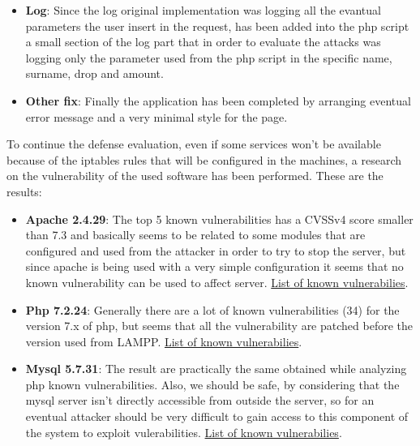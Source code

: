 \documentclass[14pt]{article}
\begin{document}
\begin{itemize}
	\item \textbf{Log}: Since the log original implementation was logging all the evantual parameters the user insert in the request, has been added into the php script a small section of the log part that in order to evaluate the attacks was logging only the parameter used from the php script in the specific name, surname, drop and amount.
	
	\item \textbf{Other fix}: Finally the application has been completed by arranging eventual error message and a very minimal style for the page.
\end{itemize}

To continue the defense evaluation, even if some services won't be available because of the iptables rules that will be configured in the machines, a research on the vulnerability of the used software has been performed. These are the results:
\begin{itemize}
	\item \textbf{Apache 2.4.29}: The top 5 known vulnerabilities has a CVSSv4 score smaller than 7.3 and basically seems to be related to some modules that are configured and used from the attacker in order to try to stop the server, but since apache is being used with a very simple configuration it seems that no known vulnerability can be used to affect server. \href{https://www.cvedetails.com/vulnerability-list.php?vendor_id=45&product_id=66&version_id=241078&page=1&hasexp=0&opdos=0&opec=0&opov=0&opcsrf=0&opgpriv=0&opsqli=0&opxss=0&opdirt=0&opmemc=0&ophttprs=0&opbyp=0&opfileinc=0&opginf=0&cvssscoremin=0&cvssscoremax=0&year=0&month=0&cweid=0&order=3&trc=18&sha=e3f39e55231940b8282f47396e556881d5954cd3}{List of known vulnerabilies}.
	
	\item \textbf{Php 7.2.24}: Generally there are a lot of known vulnerabilities (34) for the version 7.x of php, but seems that all the vulnerability are patched before the version used from LAMPP. \href{https://www.cvedetails.com/vulnerability-list.php?vendor_id=74&product_id=128&version_id=235668&page=1&hasexp=0&opdos=0&opec=0&opov=0&opcsrf=0&opgpriv=0&opsqli=0&opxss=0&opdirt=0&opmemc=0&ophttprs=0&opbyp=0&opfileinc=0&opginf=0&cvssscoremin=0&cvssscoremax=0&year=0&month=0&cweid=0&order=3&trc=34&sha=2f75abb453af67c2cfdd59ab77666b9572304c78}{List of known vulnerabilies}.
	
	\item \textbf{Mysql 5.7.31}: The result are practically the same obtained while analyzing php known vulnerabilities. Also, we should be safe, by considering that the mysql server isn't directly accessible from outside the server, so for an eventual attacker should be very difficult to gain access to this component of the system to exploit vulerabilities. \href{https://www.cvedetails.com/vulnerability-list.php?vendor_id=93&product_id=21801&version_id=242149&page=1&hasexp=0&opdos=0&opec=0&opov=0&opcsrf=0&opgpriv=0&opsqli=0&opxss=0&opdirt=0&opmemc=0&ophttprs=0&opbyp=0&opfileinc=0&opginf=0&cvssscoremin=0&cvssscoremax=0&year=0&month=0&cweid=0&order=3&trc=100&sha=620313f8a90c589726af95aa0b4d06477f2a7496
	}{List of known vulnerabilies}.
\end{itemize}
\end{document}
